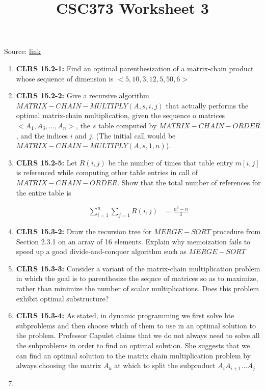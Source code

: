 \documentclass[12pt]{article}
\begin{document}
\title{CSC373 Worksheet 3}
\maketitle

\bigskip

Source: \href{http://www.cs.toronto.edu/~denisp/csc373/material.html}{link}

\begin{enumerate}[1.]
    \item \textbf{CLRS 15.2-1:} Find an optimal parenthesization of a matrix-chain product whose sequence of dimension is
    $<5,10,3,12,5,50,6>$

    \item \textbf{CLRS 15.2-2:} Give a recursive algorithm $MATRIX-CHAIN-MULTIPLY(A,s,i,j)$ that actually
    performs the optimal matrix-chain multiplication, given the sequence o matrices $<A_1, A_3, ..., A_n>$,
    the $s$ table computed by $MATRIX-CHAIN-ORDER$, and the indices $i$ and $j$. (The
    initial call would be $MATRIX-CHAIN-MULTIPLY(A,s,1,n)$).

    \item \textbf{CLRS 15.2-5:} Let $R(i,j)$ be the number of times that table entry $m[i,j]$ is referenced
    while computing other table entries in call of $MATRIX-CHAIN-ORDER$. Show that the
    total number of references for the entire table is

    \begin{align*}
    \sum\limits_{i=1}^n \sum\limits_{j=1} R(i,j) &= \frac{n^3 - n}{3}
    \end{align*}

    \item \textbf{CLRS 15.3-2:} Draw the recursion tree for $MERGE-SORT$ procedure from Section 2.3.1 on an
    array of 16 elements. Explain why memoization fails to speed up a good divide-and-conquer algorithm such as $MERGE-SORT$

    \item \textbf{CLRS 15.3-3:} Consider a variant of the matrix-chain multiplication problem in which the goal
    is to parenthesize the seqnce of matrices so as to maximize, rather than minimize the number of scalar multiplications.
    Does this problem exhibit optimal substructure?

    \item \textbf{CLRS 15.3-4:} As stated, in dynamic programming we first solve hte subproblems and then choose which of them
    to use in an optimal solution to the problem. Professor Capulet claims that we do not always need to solve all the subproblems
    in order to find an optimal solution. She suggests that we can find an optimal solution to the matrix chain multiplication problem
    by always choosing the matrix $A_k$ at which to split the subproduct $A_iA_{i+1}...A_j$
    \item
\end{enumerate}
\end{document}
